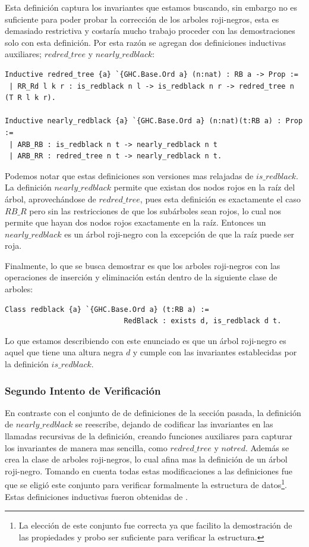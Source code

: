 \documentclass[8pt,leqno,pdflatex,spanish]{book}
\newcommand{\arn}{árbol roji-negro}
\newcommand{\arns}{arboles roji-negros}
\theoremstyle{plain}
\theoremstyle{definition}
\theoremstyle{remark}
\begin{document}
Esta definici\'on captura los invariantes que estamos buscando, sin embargo no es suficiente para 
poder probar la correcci\'on de los {\arns}, esta es demasiado restrictiva y costaría mucho 
trabajo proceder con las demostraciones solo con esta definici\'on. Por esta razón se agregan dos 
definiciones inductivas auxiliares; $redred\_tree$ y $nearly\_redblack$: 

\begin{verbatim}
Inductive redred_tree {a} `{GHC.Base.Ord a} (n:nat) : RB a -> Prop :=
 | RR_Rd l k r : is_redblack n l -> is_redblack n r -> redred_tree n (T R l k r).

Inductive nearly_redblack {a} `{GHC.Base.Ord a} (n:nat)(t:RB a) : Prop :=
 | ARB_RB : is_redblack n t -> nearly_redblack n t
 | ARB_RR : redred_tree n t -> nearly_redblack n t.
\end{verbatim}

Podemos notar que estas definiciones son versiones mas relajadas de $is\_redblack$. La 
definici\'on $nearly\_redblack$ permite que existan dos nodos rojos en la ra\'iz del \'arbol, 
aprovech\'andose de $redred\_tree$, pues esta definici\'on es exactamente el caso $RB\_R$ pero sin 
las restricciones de que los sub\'arboles sean rojos, lo cual nos permite que hayan dos nodos 
rojos exactamente en la ra\'iz. Entonces un $nearly\_redblack$ es un {\arn} con la excepci\'on de 
que la ra\'iz puede ser roja. 

Finalmente, lo que se busca demostrar es que los {\arns} con las operaciones de inserci\'on y 
eliminaci\'on están dentro de la siguiente clase de arboles:

\begin{verbatim}
Class redblack {a} `{GHC.Base.Ord a} (t:RB a) := 
                            RedBlack : exists d, is_redblack d t.
\end{verbatim}

Lo que estamos describiendo con este enunciado es que un {\arn} es aquel que tiene una altura 
negra $d$ y cumple con las invariantes establecidas por la definici\'on $is\_redblack$.

\subsubsection{Segundo Intento de Verificaci\'on}
En contraste con el conjunto de de definiciones de la secci\'on pasada, la definici\'on de 
$nearly\_redblack$ se reescribe, dejando de codificar las invariantes en las llamadas recursivas 
de la definición, creando funciones auxiliares para capturar los invariantes de manera mas 
sencilla, como $redred\_tree$ y $notred$. Además se crea la clase de {\arns}, lo cual afina mas la 
definici\'on de un {\arn}. Tomando en cuenta todas estas modificaciones a las definiciones fue que 
se eligió este conjunto para verificar formalmente la estructura de datos\footnote{La elecci\'on 
de este conjunto fue correcta ya que facilito la demostraci\'on de las propiedades y probo ser 
suficiente para verificar la estructura.}. 
Estas definiciones inductivas fueron obtenidas de \cite{MSetRBT}.
\end{document}
